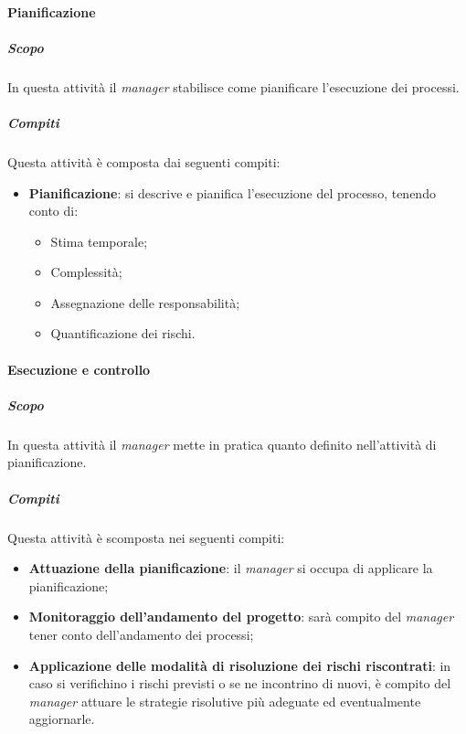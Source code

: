 \paragraph{Pianificazione}
\label{par:pianificazione}
\subparagraph{Scopo}
\label{par:pianificazione:scopo}
In questa attività il \emph{manager} stabilisce come pianificare l'esecuzione dei processi.\\
\subparagraph{Compiti}
\label{par:pianificazione:compiti}
Questa attività è composta dai seguenti compiti:
\begin{itemize}
    \item \textbf{Pianificazione}: si descrive e pianifica l'esecuzione del processo, tenendo conto di:
    \begin{itemize}
        \item Stima temporale;
        \item Complessità;
        \item Assegnazione delle responsabilità;
        \item Quantificazione dei rischi.
    \end{itemize}
\end{itemize}

\paragraph{Esecuzione e controllo}
\label{par:esecuzione_e_controllo}
\subparagraph{Scopo}
\label{par:esecuzione_e_controllo:scopo}
In questa attività il \emph{manager} mette in pratica quanto definito nell'attività di pianificazione.
\subparagraph{Compiti}
\label{par:esecuzione_e_controllo:compiti}
Questa attività è scomposta nei seguenti compiti:
\begin{itemize}
    \item \textbf{Attuazione della pianificazione}: il \emph{manager} si occupa di applicare la pianificazione;
    \item \textbf{Monitoraggio dell'andamento del progetto}: sarà compito del \emph{manager} tener conto dell'andamento dei processi;
    \item \textbf{Applicazione delle modalità di risoluzione dei rischi riscontrati}: in caso si verifichino i rischi previsti o se ne incontrino di nuovi, è compito del \emph{manager} attuare le strategie risolutive più adeguate ed eventualmente aggiornarle.
\end{itemize}

